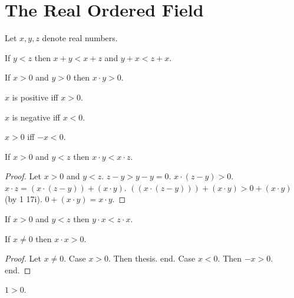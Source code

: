 \documentclass{article}
\begin{document}
\section{The Real Ordered Field}

\begin{forthel}
Let $x,y,z$ denote real numbers.

\begin{axiom}[1 17 i]
If $y < z$ then $x + y < x + z$ and $y + x < z + x$.
\end{axiom}

\begin{axiom}[1 17 ii]
If $x > 0$ and $y > 0$ then $x \cdot y > 0$.
\end{axiom}

\begin{definition}
$x$ is positive iff $x > 0$.
\end{definition}

\begin{definition}
$x$ is negative iff $x < 0$.
\end{definition}


\begin{proposition}[1 18 a]
$x > 0$ iff $-x < 0$.
\end{proposition}

\begin{proposition}[1 18 b]
If $x > 0$ and $y < z$ then
$x \cdot y < x \cdot z$.
\end{proposition}
\begin{proof}
Let $x > 0$ and $y < z$.
$z - y > y - y = 0$.
$x \cdot (z - y) > 0$.
$x \cdot z = (x \cdot (z - y)) + (x \cdot y)$.
$((x \cdot (z - y))) + (x \cdot y)  > 0 + (x \cdot y)$ (by 1 17i).
$0 + (x \cdot y) = x \cdot y$.
\end{proof}

\begin{proposition}[1 18 bb]
If $x > 0$ and $y < z$ then
$y \cdot x < z \cdot x$.
\end{proposition}


\begin{proposition}[1 18 d]
If $x \neq 0$ then $x \cdot x > 0$.
\end{proposition}
\begin{proof}
Let $x \neq 0$.
Case $x > 0$. Then thesis. end.
Case $x < 0$. Then $ -x > 0$. end.
\end{proof}

\begin{proposition}[1 18 dd]
$1 > 0$.
\end{proposition}


\end{forthel}
\end{document}
